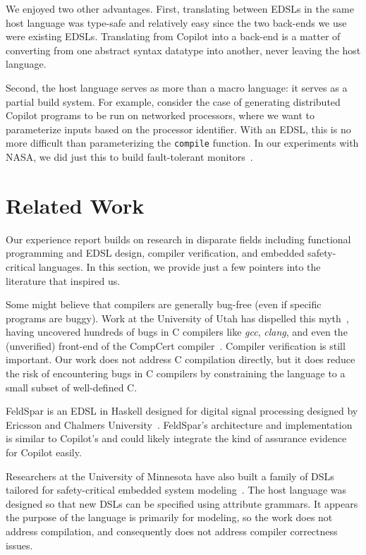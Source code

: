 \documentclass[preprint]{sigplanconf}
\begin{document}
We enjoyed two other advantages.  First, translating between EDSLs in the same
host language was type-safe and relatively easy since the two back-ends we use were
existing EDSLs.  Translating from Copilot into a back-end is a matter of
converting from one abstract syntax datatype into another, never leaving the host
language.  

Second, the host language serves as more than a macro language: it serves as a
partial build system.  For example, consider the case of generating distributed
Copilot programs to be run on networked processors, where we want to
parameterize inputs based on the processor identifier.  With an EDSL, this is no
more difficult than parameterizing the {\tt compile} function.  In our
experiments with NASA, we did just this to build fault-tolerant
monitors~\cite{pike-rv-11}.


\section{Related Work}
\label{sec:related}

Our experience report builds on research in disparate fields including
functional programming and EDSL design, compiler verification, and embedded
safety-critical languages.  In this section, we provide just a few pointers into
the literature that inspired us.

Some might believe that compilers are generally bug-free (even if specific
programs are buggy).  Work at the University of Utah has dispelled this
myth~\cite{rehger}, having uncovered hundreds of bugs in C compilers like
\emph{gcc}, \emph{clang}, and even the (unverified) front-end of the CompCert
compiler~\cite{leroy}.  Compiler verification is still important.  Our work does
not address C compilation directly, but it does reduce the risk of encountering
bugs in C compilers by constraining the language to a small subset of
well-defined C.


FeldSpar is an EDSL in Haskell designed for digital signal processing designed
by Ericsson and Chalmers University~\cite{feldspar1}.  FeldSpar's architecture
and implementation is similar to Copilot's and could likely integrate the kind
of assurance evidence for Copilot easily.

Researchers at the University of Minnesota have also built a family of DSLs
tailored for safety-critical embedded system modeling~\cite{mats}.  The host
language was designed so that new DSLs can be specified using attribute grammars.
It appears the purpose of the language is primarily for modeling, so the work
does not address compilation, and consequently does not address compiler
correctness issues.
\end{document}
